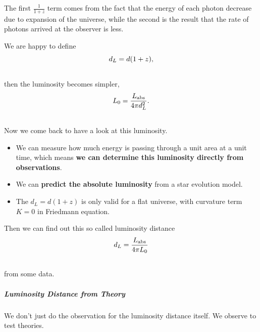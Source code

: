 \documentclass[letterpaper,10pt,english]{sphinxmanual}
\begin{document}
The first $\frac{1}{1+z}$ term comes from the fact that the energy of each photon decrease due to expansion of the universe, while the second is the result that the rate of photons arrived at the observer is less.

We are happy to define
\begin{gather}
\begin{split}d_L = d (1+z) ,\end{split}\notag\\\begin{split}\end{split}\notag
\end{gather}
then the luminosity becomes simpler,
\begin{gather}
\begin{split}L_0 = \frac{L_{\mathrm {abs}}}{4\pi d_L^2} .\end{split}\notag\\\begin{split}\end{split}\notag
\end{gather}
Now we come back to have a look at this luminosity.
\begin{itemize}
\item {} 
We can measure how much energy is passing through a unit area at a unit time, which means \textbf{we can determine this luminosity directly from observations}.

\item {} 
We can \textbf{predict the absolute luminosity} from a star evolution model.

\item {} 
The $d_L = d (1+z)$ is only valid for a flat universe, with curvature term $K=0$ in Friedmann equation.

\end{itemize}

Then we can find out this so called luminosity distance
\begin{gather}
\begin{split}d_L = \frac{  L_{\mathrm {abs}} }{ 4\pi L_0 }\end{split}\notag\\\begin{split}\end{split}\notag
\end{gather}
from some data.


\subparagraph{Luminosity Distance from Theory}
\label{Cosmology/cosmoIndex:luminosity-distance-from-theory}
We don't just do the observation for the luminosity distance itself.
We observe to test theories.
\end{document}
